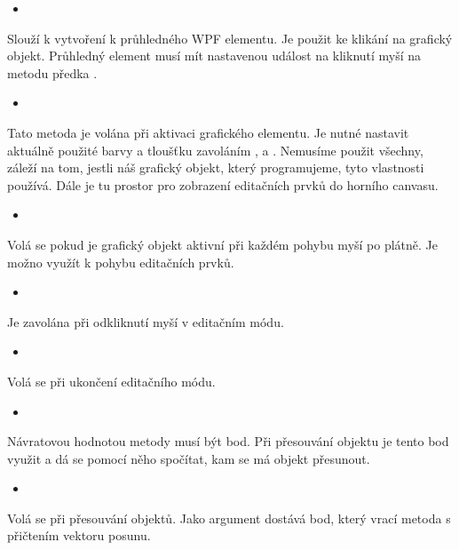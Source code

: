 \documentclass[
  field=inf,
  biblatex,
  glossaries,
  index
]{kidiplom}
\begin{document}
\begin{itemize}
\item {}
\end{itemize}
Slouží k vytvoření k průhledného WPF elementu. Je použit ke klikání na grafický objekt. Průhledný element musí mít nastavenou událost na kliknutí myší na metodu předka .

\begin{itemize}
\item {}
\end{itemize}
Tato metoda je volána při aktivaci grafického elementu. Je nutné nastavit aktuálně použité barvy a tloušťku zavoláním ,  a . Nemusíme použit všechny, záleží na tom, jestli náš grafický objekt, který programujeme, tyto vlastnosti používá.
Dále je tu prostor pro zobrazení editačních prvků do horního canvasu.

\begin{itemize}
\item {}
\end{itemize}
Volá se pokud je grafický objekt aktivní při každém pohybu myší po plátně. Je možno využít k pohybu editačních prvků.

\begin{itemize}
\item {}
\end{itemize}
Je zavolána při odkliknutí myší v editačním módu.

\begin{itemize}
\item {}
\end{itemize}
Volá se při ukončení editačního módu.

\begin{itemize}
\item {}
\end{itemize}
Návratovou hodnotou metody musí být bod. Při přesouvání objektu je tento bod využit a dá se pomocí něho spočítat, kam se má objekt přesunout.

\begin{itemize}
\item {}
\end{itemize}
Volá se při přesouvání objektů. Jako argument dostává bod, který vrací metoda  s přičtením vektoru posunu.
\end{document}
